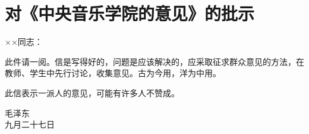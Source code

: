 \section[对《中央音乐学院的意见》的批示（一九六四年九月二十七日）]{对《中央音乐学院的意见》的批示}


××同志：

此件请一阅。信是写得好的，问题是应该解决的，应采取征求群众意见的方法，在教师、学生中先行讨论，收集意见。古为今用，洋为中用。

此信表示一派人的意见，可能有许多人不赞成。
{\raggedleft 毛泽东\\九月二十七日\par}


